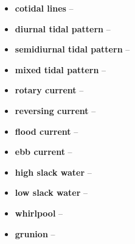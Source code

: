 \begin{itemize}
    \item \textbf{cotidal lines} --
    \item \textbf{diurnal tidal pattern} --
    \item \textbf{semidiurnal tidal pattern} --
    \item \textbf{mixed tidal pattern} --
    \item \textbf{rotary current} --
    \item \textbf{reversing current} --
    \item \textbf{flood current} --
    \item \textbf{ebb current} --
    \item \textbf{high slack water} --
    \item \textbf{low slack water} --
    \item \textbf{whirlpool} --
    \item \textbf{grunion} --
\end{itemize}